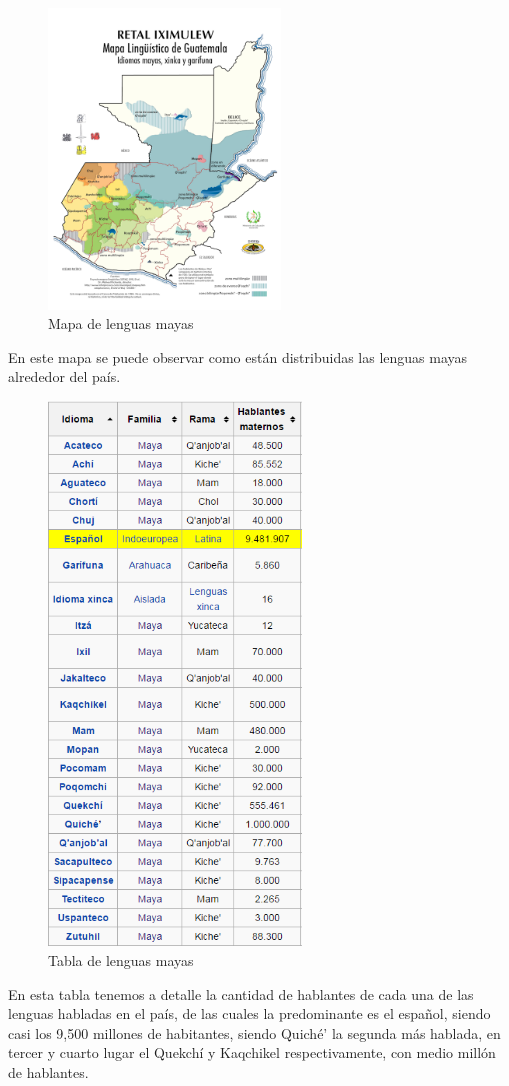 \documentclass[a4paper,openright,11pt]{article}
\begin{document}
\begin{figure}[H]
	\centering
	\includegraphics[width=0.55\textwidth]{mapa}
	\caption{Mapa de lenguas mayas}
	\label{fig:map}
\end{figure}
En este mapa se puede observar como están distribuidas las lenguas mayas alrededor del país.

\begin{figure}[H]
	\centering
	\includegraphics[width=0.6\textwidth]{tablalenguas}
	\caption{Tabla de lenguas mayas}
	\label{fig:tabla}
\end{figure}
En esta tabla tenemos a detalle la cantidad de hablantes de cada una de las lenguas habladas en el país, de las cuales la predominante es el español, siendo casi los 9,500 millones de habitantes, siendo Quiché' la segunda más hablada, en tercer y cuarto lugar el Quekchí y Kaqchikel respectivamente, con medio millón de hablantes.
\end{document}
